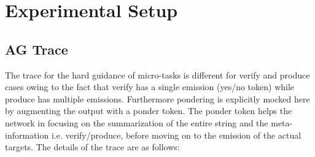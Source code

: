 %


\section{Experimental Setup}

\subsection{AG Trace}\label{mt:ponder}
The trace for the hard guidance of micro-tasks is different for verify and produce cases owing to the fact that verify has a single emission (yes/no token) while produce has multiple emissions. Furthermore pondering is explicitly mocked here by augmenting the output with a ponder token. The ponder token helps the network in focusing on the summarization of the entire string and the meta-information i.e. verify/produce, before moving on to the emission of the actual targets. The details of the trace are as follows:


